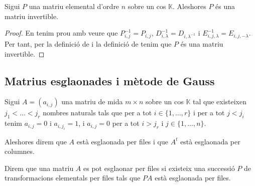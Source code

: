 \documentclass[../Apunts.tex]{subfiles}
\begin{document}
	\begin{proposition}
		\label{prop:les matrius elementals són invertibles}
		Sigui \(P\) una matriu elemental d'ordre \(n\) sobre un cos \(\mathbb{K}\). Aleshores \(P\) és una matriu invertible.
		\begin{proof}
			En tenim prou amb veure que \(P_{i,j}^{-1}=P_{i,j}\), \(D_{i,\lambda}^{-1}=D_{i,\lambda^{-1}}\) i \(E_{i,j,\lambda}^{-1}=E_{i,j,-\lambda}\). Per tant, per la definició de  i la definició de  tenim que \(P\) és una matriu invertible.
		\end{proof}
	\end{proposition}
	\subsection{Matrius esglaonades i mètode de Gauss}
	\begin{definition}
		\label{def:matriu esglaonada}
		Sigui \(A=(a_{i,j})\) una matriu de mida \(m\times n\) sobre un cos \(\mathbb{K}\) tal que existeixen \(j_{1}<\dots<j_{r}\) nombres naturals tals que per a tot \(i\in\{1,\dots,r\}\) i per a tot \(j<j_{i}\) tenim \(a_{i,j}=0\) i \(a_{i,j_{i}}=1\), i \(a_{i,j}=0\) per a tot \(i>j_{r}\) i \(j\in\{1,\dots,n\}\).
		
		Aleshores direm que \(A\) està esglaonada per files i que \(A^{t}\) està esglaonada per columnes.
		
		Direm que una matriu \(A\) es pot esglaonar per files si existeix una successió \(P\) de transformacions elementals per files tals que \(PA\) està esglaonada per files.
	\end{definition}
\end{document}
